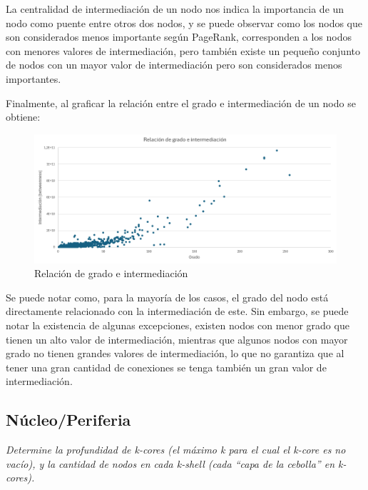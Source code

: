 \documentclass[12pt]{article}
\begin{document}
La centralidad de intermediación de un nodo nos indica la importancia de un nodo como puente entre otros dos nodos, y se puede observar como los nodos que son considerados menos importante según PageRank, corresponden a los nodos con menores valores de intermediación, pero también existe un pequeño conjunto de nodos con un mayor valor de intermediación pero son considerados menos importantes.

Finalmente, al graficar la relación entre el grado e intermediación de un nodo se obtiene:

\begin{figure}[H]
    \begin{center}
        \includegraphics[scale=0.6]{images/distribucion_grado_betweenness.png}
    \end{center}
    \caption{Relación de grado e intermediación}
    \label{fig:distribution-degree-betweenness}
\end{figure}

Se puede notar como, para la mayoría de los casos, el grado del nodo está directamente relacionado con la intermediación de este. Sin embargo, se puede notar la existencia de algunas excepciones, existen nodos con menor grado que tienen un alto valor de intermediación, mientras que algunos nodos con mayor grado no tienen grandes valores de intermediación, lo que no garantiza que al tener una gran cantidad de conexiones se tenga también un gran valor de intermediación.

\subsection{Núcleo/Periferia}
\textit{Determine la profundidad de k-cores (el máximo k para el cual el k-core es no vacío), y la cantidad de nodos en cada k-shell (cada “capa de la cebolla” en k-cores).}
\end{document}
